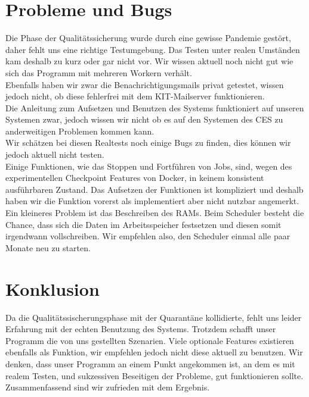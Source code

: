 \documentclass[a4paper,12pt]{article}
\begin{document}
\section{Probleme und Bugs}
Die Phase der Qualitätssicherung wurde durch eine gewisse Pandemie gestört, daher fehlt uns eine richtige Testumgebung. Das Testen unter realen Umständen kam deshalb zu kurz oder gar nicht vor. Wir wissen aktuell noch nicht gut wie sich das Programm mit mehreren Workern verhält. \\ \newline \indent Ebenfalls haben wir zwar die Benachrichtigungsmails privat getestet, wissen jedoch nicht, ob diese fehlerfrei mit dem KIT-Mailserver funktionieren. \\ \newline \indent Die Anleitung zum Aufsetzen und Benutzen des Systems funktioniert auf unseren Systemen zwar, jedoch wissen wir nicht ob es auf den Systemen des CES zu anderweitigen Problemen kommen kann. \\ \newline
\indent Wir schätzen bei diesen Realtests noch einige Bugs zu finden, dies können wir jedoch aktuell nicht testen. \\
\newline
\indent Einige Funktionen, wie das Stoppen und Fortführen von Jobs, sind, wegen des experimentellen Checkpoint Features von Docker, in keinem konsistent ausführbaren Zustand. Das Aufsetzen der Funktionen ist kompliziert und deshalb haben wir die Funktion vorerst als implementiert aber nicht nutzbar angemerkt. \\
\newline
\indent Ein kleineres Problem ist das Beschreiben des RAMs. Beim Scheduler besteht die Chance, dass sich die Daten im Arbeitsspeicher festsetzen und diesen somit irgendwann vollschreiben. Wir empfehlen also, den Scheduler einmal alle paar Monate neu zu starten. \newline
\section{Konklusion}
Da die Qualitätssischerungsphase mit der Quarantäne kollidierte, fehlt uns leider Erfahrung mit der echten Benutzung des Systems. Trotzdem schafft unser Programm die von uns gestellten Szenarien. Viele optionale Features existieren ebenfalls als Funktion, wir empfehlen jedoch nicht diese aktuell zu benutzen. Wir denken, dass unser Programm an einem Punkt angekommen ist, an dem es mit realem Testen, und sukzessiven Beseitigen der Probleme, gut funktionieren sollte.
Zusammenfassend sind wir zufrieden mit dem Ergebnis.

\clearpage
\end{document}
